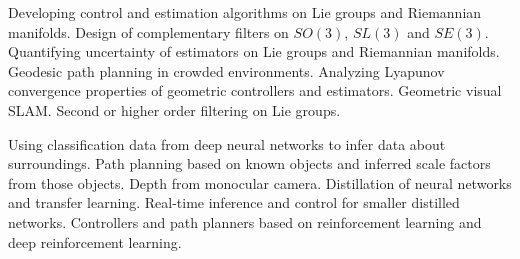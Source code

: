 

\begin{cvparagraph}
Developing control and estimation algorithms on Lie groups and Riemannian manifolds. Design of complementary filters on $SO(3)$, $SL(3)$ and $SE(3)$. Quantifying uncertainty of estimators on Lie groups and Riemannian manifolds. Geodesic path planning in crowded environments. Analyzing Lyapunov convergence properties of geometric controllers and estimators. Geometric visual SLAM. Second or higher order filtering on Lie groups. 
\end{cvparagraph}

\begin{cvparagraph}
Using classification data from deep neural networks to infer data about surroundings. Path planning based on known objects and inferred scale factors from those objects. Depth from monocular camera. Distillation of neural networks and transfer learning. Real-time inference and control for smaller distilled networks. Controllers and path planners based on reinforcement learning and deep reinforcement learning.
\end{cvparagraph}
